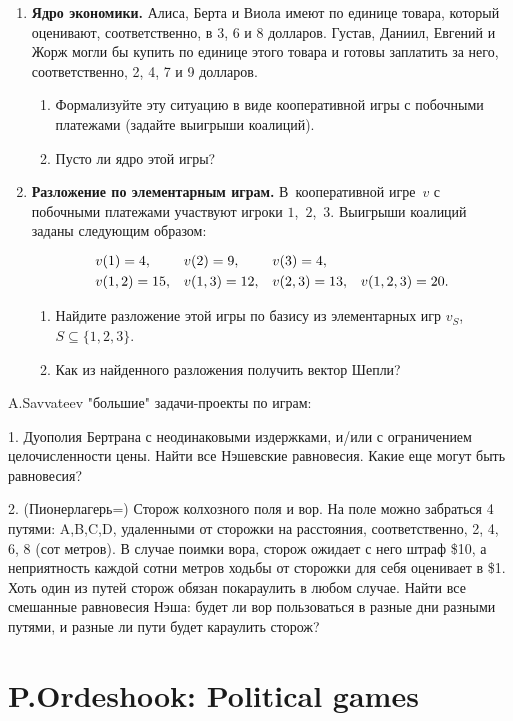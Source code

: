 \documentclass[a4paper,12pt]{article}
\def\hi{\vphantom{\Big)}}
\begin{document}
\begin{enumerate}
\item{\bf Ядро экономики.} Алиса, Берта и Виола имеют по
единице товара, который оценивают, соответственно, в 3, 6 и
8 долларов. Густав, Даниил, Евгений и Жорж могли бы купить
по единице этого товара и готовы заплатить за него,
соответственно, 2, 4, 7 и 9 долларов.
\begin{enumerate}
  \item Формализуйте эту ситуацию в виде кооперативной игры с
  побочными платежами (задайте выигрыши коалиций).
  \item Пусто ли ядро этой игры?
\end{enumerate}

\item{\bf Разложение по элементарным играм.}
В~кооперативной игре~$v$ с побочными платежами участвуют
игроки $1$,~$2$,~$3$. Выигрыши коалиций заданы следующим
образом:
\[\begin{array}{llll}
  v(1)=4,&v(2)=9,&v(3)=4,\hi\\
  v(1,2)=15,&v(1,3)=12,&v(2,3)=13,&v(1,2,3)=20.\\
\end{array}\]
\begin{enumerate}
  \item Найдите разложение этой игры по базису из элементарных игр
  $v_S$, $S\subseteq\{1,2,3\}$.
  \item Как из найденного разложения получить вектор Шепли?
\end{enumerate}

\end{enumerate}

A.Savvateev "большие" задачи-проекты по играм:

1. Дуополия Бертрана с неодинаковыми издержками,
и/или с ограничением целочисленности цены. Найти
все Нэшевские равновесия. Какие еще могут быть
равновесия?

2. (Пионерлагерь=) Сторож колхозного поля и вор. На
поле можно забраться 4 путями: A,B,C,D, удаленными
от сторожки на расстояния, соответственно, 2, 4, 6,
8 (сот метров). В случае поимки вора, сторож
ожидает с него штраф \$10, а неприятность каждой
сотни метров ходьбы от сторожки для себя оценивает
в \$1. Хоть один из путей сторож обязан покараулить
в любом случае. Найти все смешанные равновесия
Нэша: будет ли  вор пользоваться в разные дни
разными путями, и разные ли пути будет караулить
сторож?

\section{P.Ordeshook: Political games}
\end{document}
